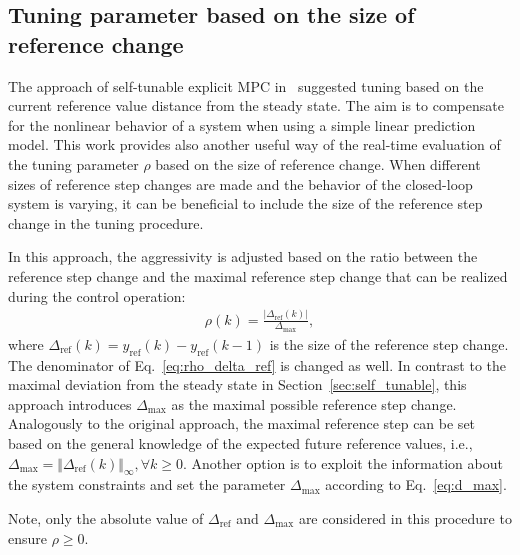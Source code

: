\documentclass[preprint,12pt]{elsarticle}
\begin{document}
	
	\subsection{Tuning parameter based on the size of reference change}
	\label{sec:self_tunable_delta_ref}
	The approach of self-tunable explicit MPC in~\cite{self_tunable} suggested tuning based on the current reference value distance from the steady state. The aim is to compensate for the nonlinear behavior of a system when using a simple linear prediction model. This work provides also another useful way of the real-time evaluation of the tuning parameter $\rho$ based on the size of reference change. When different sizes of reference step changes are made and the behavior of the closed-loop system is varying, it can be beneficial to include the size of the reference step change in the tuning procedure.
	
	In this approach, the aggressivity is adjusted based on the ratio between the reference step change and the maximal reference step change that can be realized during the control operation:
	\begin{eqnarray}
		\label{eq:rho_delta_ref}
		\rho(k) = \frac{\vert \Delta_{\mathrm{ref}}(k) \vert}{\Delta_{\max}},
	\end{eqnarray} 
	where $\Delta_{\mathrm{ref}}(k) = y_{\mathrm{ref}}(k) - y_{\mathrm{ref}}(k-1)$ is the size of the reference step change. The denominator of Eq.~\eqref{eq:rho_delta_ref} is changed as well. In contrast to the maximal deviation from the steady state in Section~\ref{sec:self_tunable}, this approach introduces $\Delta_{\max}$ as the maximal possible reference step change. Analogously to the original approach, the maximal reference step can be set based on the general knowledge of the expected future reference values, i.e., $\Delta_{\max} = \Vert \Delta_{\mathrm{ref}}(k) \Vert_{\infty}, \forall k \ge 0 $. 
	Another option is to exploit the information about the system constraints and set the parameter $\Delta_{\max}$ according to Eq.~\eqref{eq:d_max}. 
	
	Note, only the absolute value of $\Delta_{\mathrm{ref}}$ and $\Delta_{\max}$ are considered in this procedure to ensure $\rho \ge 0$. 
	
\end{document}
